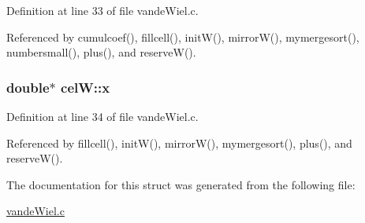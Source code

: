 Definition at line 33 of file vandeWiel.c.

Referenced by cumulcoef(), fillcell(), initW(), mirrorW(), mymergesort(), numbersmall(), plus(), and reserveW().\hypertarget{structcelW_b443b2a7120f170c2c5e8012f4dd86d7}{
\subsubsection[x]{\setlength{\rightskip}{0pt plus 5cm}double$\ast$ {\bf celW::x}}}
\label{structcelW_b443b2a7120f170c2c5e8012f4dd86d7}




Definition at line 34 of file vandeWiel.c.

Referenced by fillcell(), initW(), mirrorW(), mymergesort(), plus(), and reserveW().

The documentation for this struct was generated from the following file:\begin{CompactItemize}
\item 
\hyperlink{vandeWiel_8c}{vandeWiel.c}\end{CompactItemize}
